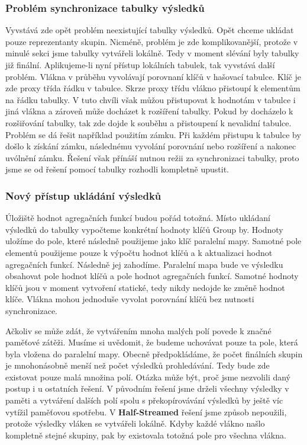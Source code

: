\subsubsection{Problém synchronizace tabulky výsledků}

Vyvstává zde opět problém neexistující tabulky výsledků.
Opět chceme ukládat pouze reprezentanty skupin.
Nicméně, problém je zde komplikovanější, protože v minulé sekci jsme tabulky vytvářeli lokálně.
Tedy v moment slévání byly tabulky již finální. 
Aplikujeme-li nyní přístup lokálních tabulek, tak vyvstává další problém.
Vlákna v průběhu vyvolávají porovnaní klíčů v hašovací tabulce.
Klíč je zde proxy třída řádku v tabulce.
Skrze proxy třídu vlákno přistoupí k elementům na řádku tabulky.
V tuto chvíli však můžou přistupovat k hodnotám v tabulce i jiná vlákna a zároveň může docházet k rozšíření tabulky.
Pokud by docházelo k rozšiřování tabulky, tak zde dojde k souběhu a přistoupení k nevalidní tabulce.
Problém se dá řešit například použitím zámku.
Při každém přistupu k tabulce by došlo k získání zámku, následnému vyvolání porovnání nebo rozšíření a nakonec uvólnění zámku.
Řešení však přínáší nutnou režii za synchronizaci tabulky, proto jsme se od řešení pomocí tabulky rozhodli kompletně upustit.

\subsubsection{Nový přístup ukládání výsledků}

Úložiště hodnot agregačních funkcí budou pořád totožná.
Místo ukládaní výsledků do tabulky vypočteme konkrétní hodnoty klíčů Group by.
Hodnoty uložíme do pole, které následně použijeme jako klíč paralelní mapy.  
Samotné pole elementů použijeme pouze k výpočtu hodnot klíčů a k aktualizaci hodnot agregačních funkcí.
Následně jej zahodíme.
Paralelní mapa bude ve výsledku obsahovat pole hodnot klíčů a pole hodnot agregačních funkcí.
Samotné hodnoty klíčů jsou v moment vytvoření statické, tedy nikdy nedojde ke změně hodnot klíče.
Vlákna mohou jednoduše vyvolat porovnání klíčů bez nutnosti synchronizace.

Ačkoliv se může zdát, že vytvářením mnoha malých polí povede k značné paměťové zátěži.
Musíme si uvědomit, že budeme uchovávat pouze ta pole, která byla vložena do paralelní mapy.
Obecně předpokládáme, že počet finálních skupin je mnohonásobně menší než počet výsledků prohledávání.
Tedy bude zde existovat pouze malá množina polí.
Otázka může být, proč jsme nezvolili daný postup i u ostatních řešení.
V původním řešení jsme drželi všechny výsledky v paměti a vytváření dalších polí spolu s překopírovávání výsledků by ještě víc vytížil paměťovou spotřebu.
V \textbf{Half-Streamed} řešení jsme způsob nepoužili, protože výsledky vláken se vytvářeli lokálně.
Kdyby každé vlákno našlo kompletně stejné skupiny, pak by existovala totožná pole pro všechna vlákna.

